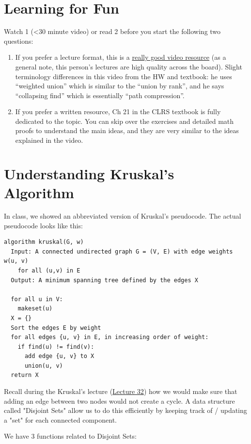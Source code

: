 \documentclass [12pt]{article}
\begin{document}
\section{Learning for Fun }
Watch 1 (<30 minute video) or read 2 before you start the following two questions:

\begin{enumerate}
  \item If you prefer a lecture format, this is a \href{https://www.youtube.com/watch?v=wU6udHRIkcc}{really good video resource} (as a general note, this person's lectures are high quality across the board). Slight terminology differences in this video from the HW and textbook: he uses “weighted union” which is similar to the “union by rank”, and he says “collapsing find” which is essentially “path compression”.
  \item If you prefer a written resource, Ch 21 in the CLRS textbook is fully dedicated to the topic. You can skip over the exercises and detailed math proofs to understand the main ideas, and they are very similar to the ideas explained in the video.
\end{enumerate}

\pagebreak
\section{Understanding Kruskal's Algorithm }
In class, we showed an abbreviated version of Kruskal's pseudocode. The actual pseudocode looks like this:

\begin{verbatim}
algorithm kruskal(G, w)
  Input: A connected undirected graph G = (V, E) with edge weights w(u, v) 
    for all (u,v) in E
  Output: A minimum spanning tree defined by the edges X

  for all u in V:
    makeset(u)
  X = {}
  Sort the edges E by weight
  for all edges {u, v} in E, in increasing order of weight:
    if find(u) != find(v):
      add edge {u, v} to X
      union(u, v)
  return X
\end{verbatim}

Recall during the Kruskal's lecture (\href{https://www.comp285.ml/lectures/#kruskal-s-algorithm-and-max-flow}{Lecture 32}) how we would make sure that adding an edge between two nodes would not create a cycle. A data structure called "Disjoint Sets" allow us to do this efficiently by keeping track of / updating a "set" for each connected component.

We have 3 functions related to Disjoint Sets:
\end{document}
